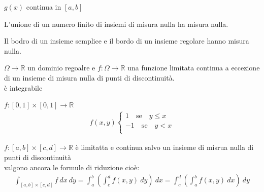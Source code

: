 \documentclass[a4paper, oneside]{article}
\begin{document}
$g(x)$ continua in $[a,b]$\\
\begin{proposition}
    L'unione di un numero finito di insiemi di misura nulla ha misura nulla.
\end{proposition}
\begin{corollary}
    Il bodro di un insieme semplice e il bordo di un insieme regolare hanno misura nulla.
\end{corollary}
\begin{theorem}
     $\Omega \to \mathbb{R}$ un dominio regoalre e $f:\Omega \to \mathbb{R}$ una funzione limitata continua a eccezione di un insieme di misura nulla di punti di discontinuità.\\
     è integrabile
\end{theorem}
\begin{example}
    $f:[0,1]\times[0,1] \to \mathbb{R}$
    \begin{gather*}
        f(x,y)\begin{cases}
            1 \quad \text{se} \quad y\leq x\\
            -1 \quad \text{se} \quad y<x\\
        \end{cases}
    \end{gather*}
\end{example}
\begin{theorem}
     $f:[a,b] \times [c,d] \to \mathbb{R}$ è limitatta e continua salvo un insieme di misrua nulla di punti di discontinuità\\
     valgono ancora le formule di riduzione cioè:
    \begin{gather*}
        \int_{[a,b]\times[c,d]} f \ dx \ dy = \int_{a}^{b} \left( \int_{c}^{d} f(x,y) \ dy \right) \ dx = \int_{c}^{d} \left( \int_{a}^{b} f(x,y) \ dx \right) \ dy  
    \end{gather*}
\end{theorem}
\end{document}
